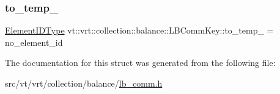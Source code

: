 \mbox{\label{structvt_1_1vrt_1_1collection_1_1balance_1_1_l_b_comm_key_a0bf597575c3107ee826fce4a631c5d06}} 
\subsubsection{\texorpdfstring{to\+\_\+temp\+\_\+}{to\_temp\_}}
{\footnotesize\ttfamily \hyperlink{namespacevt_1_1vrt_1_1collection_1_1balance_a14c8d2c972f2913aa3f1636e5be0a120}{Element\+I\+D\+Type} vt\+::vrt\+::collection\+::balance\+::\+L\+B\+Comm\+Key\+::to\+\_\+temp\+\_\+ = no\+\_\+element\+\_\+id}



The documentation for this struct was generated from the following file\+:\begin{DoxyCompactItemize}
\item 
src/vt/vrt/collection/balance/\hyperlink{lb__comm_8h}{lb\+\_\+comm.\+h}\end{DoxyCompactItemize}
